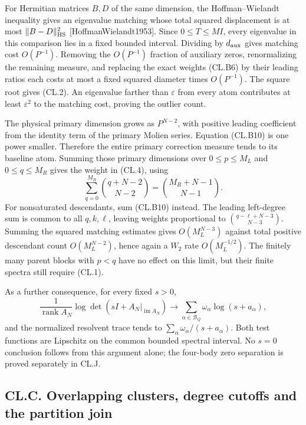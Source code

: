 \documentclass[a4paper,11pt]{article}
\numberwithin{equation}{section}
\begin{document}
For Hermitian matrices \(B,D\) of the same dimension, the Hoffman--Wielandt inequality gives an eigenvalue matching whose total squared displacement is at most \(\|B-D\|_{\rm HS}^2\) {[}HoffmanWielandt1953{]}. Since \(0\leq T\leq MI\), every eigenvalue in this comparison lies in a fixed bounded interval. Dividing by \(d_{\rm aux}\) gives matching cost \(O(P^{-1})\). Removing the \(O(P^{-1})\) fraction of auxiliary zeros, renormalizing the remaining measure, and replacing the exact weights (CL.B6) by their leading ratios each costs at most a fixed squared diameter times \(O(P^{-1})\). The square root gives (CL.2). An eigenvalue farther than \(\varepsilon\) from every atom contributes at least \(\varepsilon^2\) to the matching cost, proving the outlier count.

The physical primary dimension grows as \(P^{N-2}\), with positive leading coefficient from the identity term of the primary Molien series. Equation (CL.B10) is one power smaller. Therefore the entire primary correction measure tends to its baseline atom. Summing those primary dimensions over \(0\leq p\leq M_L\) and \(0\leq q\leq M_R\) gives the weight in (CL.4), using \[
\sum_{q=0}^{M_R}\binom{q+N-2}{N-2}
=\binom{M_R+N-1}{N-1}.
\] For nonsaturated descendants, sum (CL.B10) instead. The leading left-degree sum is common to all \(q,k,\ell\), leaving weights proportional to \(\binom{q-\ell+N-3}{N-3}\). Summing the squared matching estimates gives \(O(M_L^{N-3})\) against total positive descendant count \(O(M_L^{N-2})\), hence again a \(W_2\) rate \(O(M_L^{-1/2})\). The finitely many parent blocks with \(p<q\) have no effect on this limit, but their finite spectra still require (CL.1).

As a further consequence, for every fixed \(s>0\), \[
\frac1{\operatorname{rank}A_N}
\log\det(sI+A_N|_{\operatorname{im}A_N})
\longrightarrow\sum_{\alpha\in\mathcal B_Q}\omega_\alpha\log(s+a_\alpha),
\] and the normalized resolvent trace tends to \(\sum_\alpha\omega_\alpha/(s+a_\alpha)\). Both test functions are Lipschitz on the common bounded spectral interval. No \(s=0\) conclusion follows from this argument alone; the four-body zero separation is proved separately in CL.J.

\hypertarget{cl.c.-overlapping-clusters-degree-cutoffs-and-the-partition-join}{%
\subsection{CL.C. Overlapping clusters, degree cutoffs and the partition join}\label{cl.c.-overlapping-clusters-degree-cutoffs-and-the-partition-join}}
\end{document}

